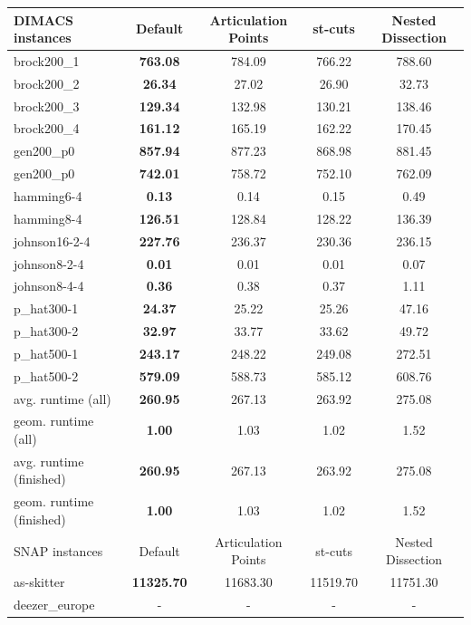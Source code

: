 \documentclass[a4paper,UKenglish,cleveref, autoref, thm-restate]{lipics-v2021}
\begin{document}
\begin{table}
	\begin{center}
		\begin{tabular}{|l|c|c|c|c|}
			\hline	
			DIMACS instances & Default & Articulation Points & st-cuts & Nested Dissection \\
			\hline
			brock200\_1 & \textbf{763.08} & 784.09 & 766.22 & 788.60 \\
			brock200\_2 & \textbf{26.34} & 27.02 & 26.90 & 32.73 \\
			brock200\_3 & \textbf{129.34} & 132.98 & 130.21 & 138.46 \\
			brock200\_4 & \textbf{161.12} & 165.19 & 162.22 & 170.45 \\
			gen200\_p0 & \textbf{857.94} & 877.23 & 868.98 & 881.45 \\
			gen200\_p0 & \textbf{742.01} & 758.72 & 752.10 & 762.09 \\
			hamming6-4 & \textbf{0.13} & 0.14 & 0.15 & 0.49 \\
			hamming8-4 & \textbf{126.51} & 128.84 & 128.22 & 136.39 \\
			johnson16-2-4 & \textbf{227.76} & 236.37 & 230.36 & 236.15 \\
			johnson8-2-4 & \textbf{0.01} & 0.01 & 0.01 & 0.07 \\
			johnson8-4-4 & \textbf{0.36} & 0.38 & 0.37 & 1.11 \\
			p\_hat300-1 & \textbf{24.37} & 25.22 & 25.26 & 47.16 \\
			p\_hat300-2 & \textbf{32.97} & 33.77 & 33.62 & 49.72 \\
			p\_hat500-1 & \textbf{243.17} & 248.22 & 249.08 & 272.51 \\
			p\_hat500-2 & \textbf{579.09} & 588.73 & 585.12 & 608.76 \\
			\hline
			avg. runtime (all) & \textbf{260.95} & 267.13 & 263.92 & 275.08 \\
			geom. runtime (all) & \textbf{1.00} & 1.03 & 1.02 & 1.52 \\
			avg. runtime (finished) & \textbf{260.95} & 267.13 & 263.92 & 275.08 \\
			geom. runtime (finished) & \textbf{1.00} & 1.03 & 1.02 & 1.52 \\
			\hline
			\hline			
			SNAP instances & Default & Articulation Points & st-cuts & Nested Dissection \\
			\hline
			as-skitter & \textbf{11325.70} & 11683.30 & 11519.70 & 11751.30 \\
			deezer\_europe & - & - & - & - \\

\end{tabular}
\end{center}
\end{table}
\end{document}
